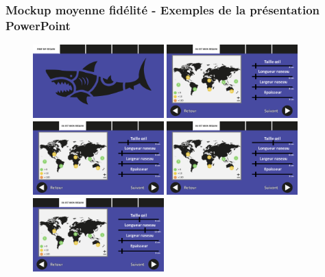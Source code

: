 \documentclass{article}
\begin{document}
\subsubsection{Mockup moyenne fidélité - Exemples de la présentation PowerPoint}

\begin{figure}[!h]

	\centering
	\includegraphics[width=0.45\textwidth]{assets/prototype/haute/Diapositive1}
	\hfill
	\includegraphics[width=0.45\textwidth]{assets/prototype/haute/Diapositive2}
	\includegraphics[width=0.45\textwidth]{assets/prototype/haute/Diapositive3}
	\hfill
	\includegraphics[width=0.45\textwidth]{assets/prototype/haute/Diapositive4}
	\includegraphics[width=0.45\textwidth]{assets/prototype/haute/Diapositive5}

\end{figure}
\end{document}
